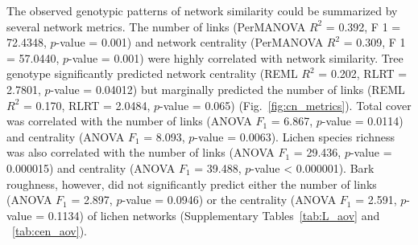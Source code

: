 \documentclass[9pt,twocolumn,twoside,lineno]{pnas-new}
\begin{document}
{The observed genotypic patterns of network similarity could be
summarized by several network metrics. The number of links (PerMANOVA
$R^2$ = 0.392, F 1 = 72.4348, $p$-value = 0.001) and network
centrality (PerMANOVA $R^2$ = 0.309, F 1 = 57.0440, $p$-value = 0.001)
were highly correlated with network similarity.  Tree genotype
significantly predicted network centrality (REML $R^2$ = 0.202, RLRT =
2.7801, $p$-value = 0.04012) but marginally predicted the number of
links (REML $R^2$ = 0.170, RLRT = 2.0484, $p$-value = 0.065)
(Fig.~\ref{fig:cn_metrics}). Total cover was correlated with the
number of links (ANOVA $F_1$ = 6.867, $p$-value = 0.0114) and
centrality (ANOVA $F_1$ = 8.093, $p$-value = 0.0063). Lichen species
richness was also correlated with the number of links (ANOVA $F_1$ =
29.436, $p$-value = 0.000015) and centrality (ANOVA $F_1$ = 39.488,
$p$-value < 0.000001). Bark roughness, however, did not significantly
predict either the number of links (ANOVA $F_1$ = 2.897, $p$-value =
0.0946) or the centrality (ANOVA $F_1$ = 2.591, $p$-value = 0.1134) of
lichen networks (Supplementary Tables~\ref{tab:L_aov} and
~\ref{tab:cen_aov}).


}
\end{document}
